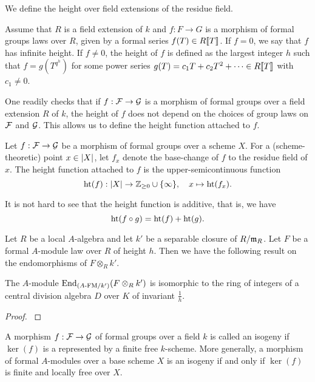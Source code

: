 \documentclass[../main.tex]{subfiles}
\begin{document}
We define the height over field extensions of the residue field. 
\begin{defi}
  Assume that $R$ is a field extension of $k$ and $f: F \to G$ is a morphism of 
  formal groups laws over $R$, given by a formal series $f(T) \in R\llbracket T \rrbracket$. 
  If $f = 0$, we say that $f$ has infinite height. 
  If $f \neq 0$, the height of $f$ is defined as the largest integer $h$ such that 
  $f = g(T^{q^h})$ for some power series $g(T) = c_1 T + c_2 T^2 + \dots \in
  R\llbracket T \rrbracket$ with $c_1 \neq 0$. 
\end{defi}
One readily checks that if $f: \mathcal{F} \to \mathcal{G}$ is a morphism of formal groups over
a field extension $R$ of $k$, the height of $f$ does not depend on the choices
of group laws on $\mathcal{F}$ and $\mathcal{G}$. This allows us to define the height function 
attached to $f$. 
\begin{defi}
  Let $f: \mathcal{F} \to \mathcal{G}$ be a morphism of formal groups over a scheme $X$.
  For a (scheme-theoretic) point $x \in \lvert X \rvert$, let $f_x$ denote the 
  base-change of $f$ to the residue field of $x$. 
  The height function attached to $f$ is the upper-semicontinuous function
  \begin{equation} \label{eq:defheight}
    \textnormal{ht}(f) : \lvert X \rvert \to \mathbb{Z}_{\geq 0} \cup \{\infty\}, \quad x \mapsto 
    \textnormal{ht}(f_x).
  \end{equation}
\end{defi}
It is not hard to see that the height function is additive, that is, we have
\begin{equation*}
  \textnormal{ht}(f \circ g) = \textnormal{ht}(f) + \textnormal{ht}(g).
\end{equation*}

Let $R$ be a local $A$-algebra and let $k'$ be a separable closure of $R/\mathfrak{m}_R$.
Let $F$ be a formal $A$-module law over $R$ of height $h$. Then we have the
following result on the endomorphisms of $F \otimes_R k'$.
\begin{lem}
  The $A$-module $\operatorname{End}_{{({A}\text-\mathrm{FM}/{k'})}}(F \otimes_R k')$ is isomorphic to the ring
  of integers of a central division algebra $D$ over $K$ of invariant $\frac 1h$.
\begin{proof}
  \cite[Proposition 1.7]{drinfel1974elliptic} 
\end{proof}
\end{lem}

\begin{defi}[Isogeny]
  A morphism $f: \mathcal{F} \to \mathcal{G}$ of formal groups over a field $k$ is called an isogeny if
  $\ker(f)$ is a represented by a finite free $k$-scheme. More generally, a
  morphism of formal $A$-modules over a base scheme $X$ is an isogeny if and
  only if $\ker(f)$ is finite and locally free over $X$. 
\end{defi}
\end{document}
